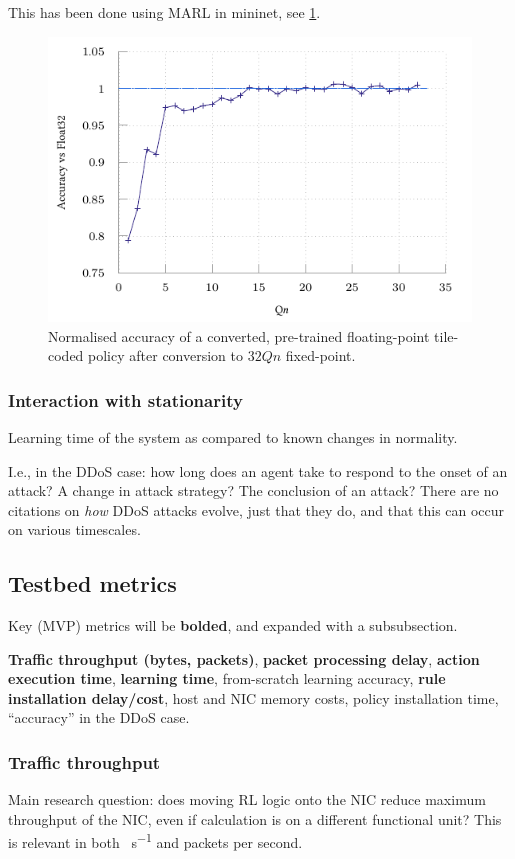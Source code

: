 \documentclass[sigconf,natbib=false]{acmart}
\begin{document}
This has been done using MARL in mininet, see \cref{fig:quant-acc}.

\begin{figure}
	\includegraphics{../plots/build/marl-quant/accuracy-binary}
	\caption{Normalised accuracy of a converted, pre-trained floating-point tile-coded policy after conversion to $32Qn$ fixed-point.}\label{fig:quant-acc}
\end{figure}

\subsubsection{Interaction with stationarity}
Learning time of the system as compared to known changes in normality.

I.e., in the DDoS case: how long does an agent take to respond to the onset of an attack?
A change in attack strategy?
The conclusion of an attack?
There are no citations on \emph{how} DDoS attacks evolve, just that they do, and that this can occur on various timescales.

\subsection{Testbed metrics}
Key (MVP) metrics will be \textbf{bolded}, and expanded with a subsubsection.

\textbf{Traffic throughput (bytes, packets)}, \textbf{packet processing delay}, \textbf{action execution time}, \textbf{learning time}, from-scratch learning accuracy, \textbf{rule installation delay/cost}, host and NIC memory costs, policy installation time, ``accuracy'' in the DDoS case.

\subsubsection{Traffic throughput}
Main research question: does moving RL logic onto the NIC reduce maximum throughput of the NIC, even if calculation is on a different functional unit?
This is relevant in both \si{\byte\per\second} and packets per second.
\end{document}
